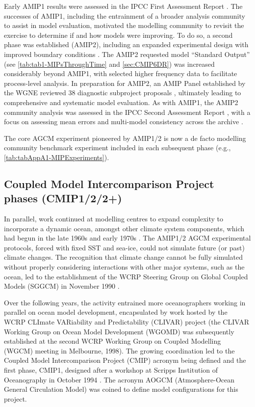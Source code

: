 \documentclass[manuscript]{copernicus}
\begin{document}
Early AMIP1 results were assessed in the IPCC First Assessment Report \citep[FAR;][]{gates_validation_1990}. The successes of AMIP1, including the entrainment of a broader analysis community to assist in model evaluation, motivated the modelling community to revisit the exercise to determine if and how models were improving. To do so, a second phase was established (AMIP2), including an expanded experimental design with improved boundary conditions \citep{liang_pcmdi_1997, taylor_pcmdi_2000}. The AMIP2 requested model ``Standard Output'' (see \autoref{tab:tab1-MIPsThroughTime} and \autoref{sec:CMIP6DR}) was increased considerably beyond AMIP1, with selected higher frequency data to facilitate process-level analysis. In preparation for AMIP2, an AMIP Panel established by the WGNE reviewed 38 diagnostic subproject proposals \citep{gleckler_amip_2001}, ultimately leading to comprehensive and systematic model evaluation. As with AMIP1, the AMIP2 community analysis was assessed in the IPCC Second Assessment Report \citep[SAR;][]{gates_climate_1996}, with a focus on assessing mean errors and multi-model consistency across the archive \citep{gates_amip_1995}.

The core AGCM experiment pioneered by AMIP1/2 is now a de facto modelling community benchmark experiment included in each subsequent phase (e.g., \autoref{tab:tabAppA1-MIPExperiments}).


\subsection{Coupled Model Intercomparison Project phases (CMIP1/2/2+)}
\label{sec:cmip1And2And2Plus}

In parallel, work continued at modelling centres to expand complexity to incorporate a dynamic ocean, amongst other climate system components, which had begun in the late 1960s and early 1970s \citep[e.g.,][]{manabe_climate_1969-1,bryan_global_1975,manabe_global_1975}. The AMIP1/2 AGCM experimental protocols, forced with fixed SST and sea-ice, could not simulate future (or past) climate changes. The recognition that climate change cannot be fully simulated without properly considering interactions with other major systems, such as the ocean, led to the establishment of the WCRP Steering Group on Global Coupled Models (SGGCM) in November 1990 \citep{meehl_role_2023}.

Over the following years, the activity entrained more oceanographers working in parallel on ocean model development, encapsulated by work hosted by the WCRP CLImate VARiability and Predictability (CLIVAR) project (the CLIVAR Working Group on Ocean Model Development (WGOMD) was subsequently established at the second WCRP Working Group on Coupled Modelling (WGCM) meeting in Melbourne, 1998). The growing coordination led to the Coupled Model Intercomparison Project (CMIP) acronym being defined and the first phase, CMIP1, designed after a workshop at Scripps Institution of Oceanography in October 1994 \citep{meehl_global_1995}. The acronym AOGCM (Atmosphere-Ocean General Circulation Model) was coined to define model configurations for this project.
\end{document}
